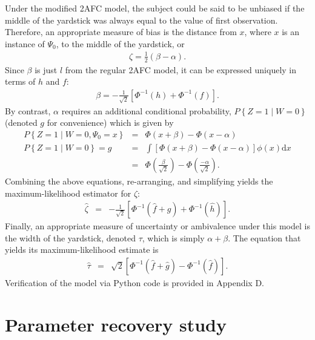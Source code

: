 \documentclass[man]{apa6}
\begin{document}
Under the modified 2AFC model, the subject could be said to be unbiased if the middle of the yardstick was always equal to the value of first observation. Therefore, an appropriate measure of bias is the distance from $x$, where $x$ is an instance of $\Psi_0$, to the middle of the yardstick, or
\begin{eqnarray*}
\zeta=\frac{1}{2}\left(\beta-\alpha\right)\textrm{.}
\end{eqnarray*}
Since $\beta$ is just $l$ from the regular 2AFC model, it can be expressed uniquely in terms of $h$ and $f$:
\begin{eqnarray*}
\beta=-\frac{1}{\sqrt{2}}\left[\Phi^{-1}\left(h\right)+\Phi^{-1}\left(f\right)\right]\textrm{.}
\end{eqnarray*}
By contrast, $\alpha$ requires an additional conditional probability, $P\left\{Z=1\mid{}W=0\right\}$ (denoted $g$ for convenience) which is given by
\begin{eqnarray*}
P\left\{Z=1\mid{}W=0,\Psi_0=x\right\}&=&\Phi\left(x+\beta\right)-\Phi\left(x-\alpha\right)\\
P\left\{Z=1\mid{}W=0\right\}=g&=&\int\!\left[\Phi\left(x+\beta\right)-\Phi\left(x-\alpha\right)\right]\phi\left(x\right)\textrm{d}x\\
&=&\Phi\left(\frac{\beta}{\sqrt{2}}\right)-\Phi\left(\frac{-\alpha}{\sqrt{2}}\right)\textrm{.}
\end{eqnarray*}
Combining the above equations, re-arranging, and simplifying yields the maximum-likelihood estimator for $\zeta$:
\begin{eqnarray}
\hat{\zeta}&=&-\frac{1}{\sqrt{2}}\left[\Phi^{-1}\left(\hat{f}+\hat{g}\right)+\Phi^{-1}\left(\hat{h}\right)\right]\textrm{.}
\end{eqnarray}
Finally, an appropriate measure of uncertainty or ambivalence under this model is the width of the yardstick, denoted $\tau$, which is simply $\alpha+\beta$. The equation that yields its maximum-likelihood estimate is
\begin{eqnarray}
\hat{\tau}&=&\sqrt{2}\left[\Phi^{-1}\left(\hat{f}+\hat{g}\right)-\Phi^{-1}\left(\hat{f}\right)\right]\textrm{.}
\end{eqnarray}Verification of the model via Python code is provided in Appendix D.


\section{Parameter recovery study}
\end{document}
